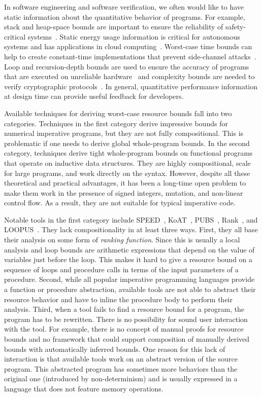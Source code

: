 \documentclass[nocopyrightspace,preprint]{sigplanconf}
\begin{document}
In software engineering and software verification,
we often would like to have static information
about the quantitative behavior of programs.
For example, stack and heap-space bounds
are important to ensure the reliability of
safety-critical systems~\cite{veristack14,Regehr05}.
Static energy usage information is critical
for autonomous systems and has applications in
cloud computing~\cite{CohenZSL12,CarrollH10}.
Worst-case time bounds can help to create
constant-time implementations that prevent
side-channel attacks~\cite{KasperS09,BartheBCLP14}.
Loop and recursion-depth bounds are used to
ensure the accuracy of programs that are executed
on unreliable hardware~\cite{CarbinMR13} and
complexity bounds are needed to verify cryptographic
protocols~\cite{BartheGB09}.  In general, quantitative
performance information at design time can provide useful
feedback for developers.





Available techniques for deriving worst-case resource bounds
fall into two categories.  Techniques
in the first category derive impressive bounds for
numerical imperative programs, but they are not fully compositional.
This is problematic if one needs to derive global whole-program bounds.
In the second category, techniques derive tight whole-program
bounds on functional programs that operate on inductive data structures.
They are highly compositional, scale for large
programs, and work directly on the syntax.  However, despite all
these theoretical and practical advantages, it has been
a long-time open problem to make them work in the
presence of signed integers, mutation, and non-linear
control flow. As a result, they are not suitable for
typical imperative code.

Notable tools in the first category include
SPEED~\cite{GulwaniMC09}, KoAT~\cite{BrockschmidtEFFG14},
PUBS~\cite{AlbertAGPZ12}, Rank~\cite{AliasDFG10},
and LOOPUS~\cite{SinnZV14}.
They lack compositionality in at least three ways.
First, they all base their analysis on some form of
\emph{ranking function}.
Since this
is usually a local analysis and loop bounds are
arithmetic expressions that depend on the value of
variables  just before the loop.
This makes it hard to give a
resource bound on a sequence of loops and procedure calls in
terms of the input parameters of a procedure.
Second, while all popular imperative programming languages
provide a function or procedure abstraction, available
tools are not able to abstract their resource behavior
and have to inline the procedure body to perform their
analysis.  Third, when a tool fails to find a resource
bound for a program, the program has to be rewritten.
There is no possibility for sound user interaction with the
tool. For example, there is no concept of manual proofs for
resource bounds and no framework that could support composition
of manually derived bounds with automatically inferred bounds.
One reason for this lack of interaction is that available tools
work on an abstract version of the source program. This
abstracted program has sometimes more behaviors than the
original one (introduced by non-determinism) and is usually
expressed in a language that does not feature memory operations.
\end{document}
